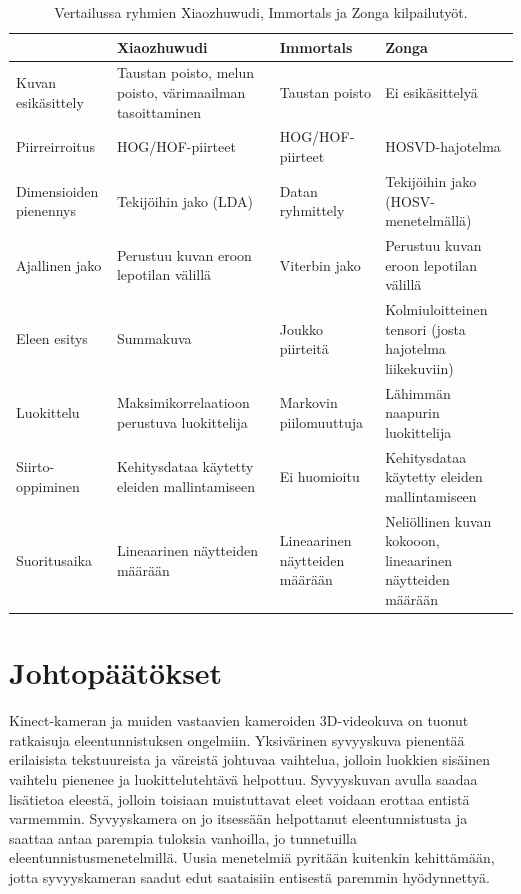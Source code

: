 \begin{table}[th]
\caption{Vertailussa ryhmien Xiaozhuwudi, Immortals ja Zonga kilpailutyöt. \citep{firstround}}
\label{table:kolmetyötä}
\begin{center}
\begin{tabular}{|p{}|p{}|p{}|p{}|} 
    \hline
 & Xiaozhuwudi & Immortals & Zonga\\
    \hline
    \hline
 Kuvan esikäsittely & Taustan poisto, melun poisto, värimaailman tasoittaminen& Taustan poisto & Ei esikäsittelyä\\
    \hline
 Piirreirroitus & HOG/HOF-piirteet & HOG/HOF-piirteet & HOSVD-hajotelma \\
    \hline
 Dimensioiden pienennys & Tekijöihin jako (LDA)& Datan ryhmittely & Tekijöihin jako (HOSV-menetelmällä)\\
    \hline	
 Ajallinen jako &Perustuu kuvan eroon lepotilan välillä &Viterbin jako &Perustuu kuvan eroon lepotilan välillä\\
     \hline
 Eleen esitys &Summakuva &Joukko piirteitä &Kolmiuloitteinen tensori (josta hajotelma liikekuviin)\\
     \hline
 Luokittelu &Maksimikorrelaatioon perustuva luokittelija &Markovin piilomuuttuja &Lähimmän naapurin luokittelija\\
      \hline
 Siirto-oppiminen &Kehitysdataa käytetty eleiden mallintamiseen&Ei huomioitu&Kehitysdataa käytetty eleiden mallintamiseen\\
      \hline
 Suoritusaika &Lineaarinen näytteiden määrään&Lineaarinen näytteiden määrään &Neliöllinen kuvan kokooon, lineaarinen näytteiden määrään\\
      \hline
	  \hline
\end{tabular}
\end{center}
\end{table}
\newpage
\section {Johtopäätökset}

Kinect-kameran ja muiden vastaavien kameroiden 3D-videokuva on tuonut ratkaisuja eleentunnistuksen ongelmiin. Yksivärinen syvyyskuva pienentää erilaisista tekstuureista
ja väreistä johtuvaa vaihtelua, jolloin luokkien sisäinen vaihtelu pienenee ja luokittelutehtävä helpottuu. Syvyyskuvan avulla
saadaa lisätietoa eleestä, jolloin toisiaan muistuttavat eleet voidaan erottaa entistä varmemmin. Syvyyskamera on jo itsessään
helpottanut eleentunnistusta ja saattaa antaa parempia tuloksia vanhoilla, jo tunnetuilla eleentunnistusmenetelmillä. Uusia menetelmiä
pyritään kuitenkin kehittämään, jotta syvyyskameran saadut edut saataisiin entisestä paremmin hyödynnettyä.\\

